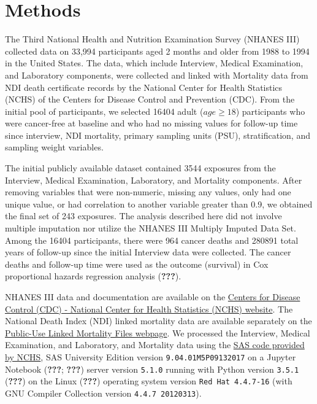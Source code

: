 \documentclass[12pt,twoside]{reedthesis}
\theoremstyle{definition}
\theoremstyle{definition}
\theoremstyle{definition}
\theoremstyle{remark}
\begin{document}
\hypertarget{methods}{%
\section{Methods}\label{methods}}

The Third National Health and Nutrition Examination Survey (NHANES III)
collected data on 33,994 participants aged 2 months and older from 1988
to 1994 in the United States. The data, which include Interview, Medical
Examination, and Laboratory components, were collected and linked with
Mortality data from NDI death certificate records by the National Center
for Health Statistics (NCHS) of the Centers for Disease Control and
Prevention (CDC). From the initial pool of participants, we selected
16404 adult (\(age \geq 18\)) participants who were cancer-free at
baseline and who had no missing values for follow-up time since
interview, NDI mortality, primary sampling units (PSU), stratification,
and sampling weight variables.

The initial publicly available dataset contained 3544 exposures from the
Interview, Medical Examination, Laboratory, and Mortality components.
After removing variables that were non-numeric, missing any values, only
had one unique value, or had correlation to another variable greater
than 0.9, we obtained the final set of 243 exposures. The analysis
described here did not involve multiple imputation nor utilize the
NHANES III Multiply Imputed Data Set. Among the 16404 participants,
there were 964 cancer deaths and 280891 total years of follow-up since
the initial Interview data were collected. The cancer deaths and
follow-up time were used as the outcome (survival) in Cox proportional
hazards regression analysis ({\textbf{???}}).

NHANES III data and documentation are available on the
\href{https://wwwn.cdc.gov/nchs/nhanes/nhanes3/DataFiles.aspx}{Centers
for Disease Control (CDC) - National Center for Health Statistics (NCHS)
website}. The National Death Index (NDI) linked mortality data are
available separately on the
\href{https://www.cdc.gov/nchs/data-linkage/mortality-public.htm}{Public-Use
Linked Mortality Files webpage}. We processed the Interview, Medical
Examination, and Laboratory, and Mortality data using the
\href{https://wwwn.cdc.gov/nchs/nhanes/nhanes3/DataFiles.aspx}{SAS code
provided by NCHS}, SAS University Edition version
\texttt{9.04.01M5P09132017} on a Jupyter Notebook ({\textbf{???}};
{\textbf{???}}) server version \texttt{5.1.0} running with Python
version \texttt{3.5.1} ({\textbf{???}}) on the Linux ({\textbf{???}})
operating system version \texttt{Red\ Hat\ 4.4.7-16} (with GNU Compiler
Collection version \texttt{4.4.7\ 20120313}).
\end{document}
